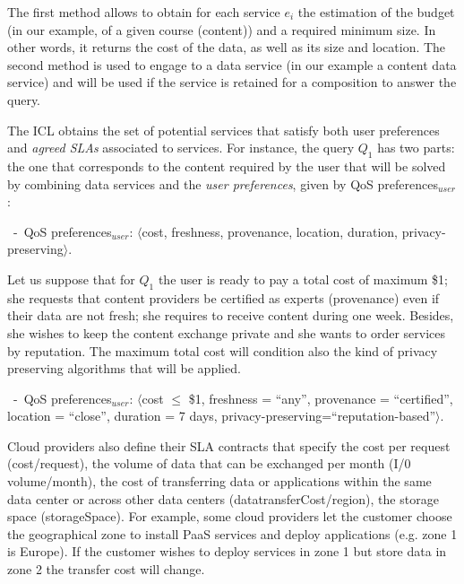  

The first method allows to obtain for each service $e_i$ the estimation of the budget (in our example, of a given course (content)) and a required minimum size. In other words, it  returns the cost of the data, as well as its  size and location.
The second method is used to engage to a data service (in our example a content data service) and will be used  if the service is retained for a composition to answer the query.

 

The ICL  obtains the set of potential services that satisfy both user preferences and   \textit{agreed SLAs} associated to services. 
For instance, the query $Q_1$ has two parts: the one that corresponds to the content required by the user  that will be solved by combining data services and the \textit{user preferences}, given by {QoS preferences}$_\mathit{user}$:
\begin{trivlist}\sf\footnotesize
\item[~-~QoS preferences$_\mathit{user}$: ] $\langle$cost, freshness, provenance, location, duration, privacy-preserving$\rangle$. 
\end{trivlist}


Let us suppose that for $Q_1$  the user is ready to pay a total cost of maximum  \$1; she requests that content providers be certified as experts (provenance) even if their data are not fresh; she requires to receive content  during  one week. Besides, she wishes to keep the content exchange private and she wants to order services by reputation. The maximum total cost will condition also the kind of privacy preserving algorithms that will be applied.
 
\begin{trivlist}\sf\footnotesize
\item[~-~QoS preferences$_\mathit{user}$: ] $\langle$cost $\leq$ \$1, freshness = ``any'', provenance = ``certified'', location = ``close'', duration = 7 days, privacy-preserving=``reputation-based''$\rangle$. 
\end{trivlist}



Cloud providers also define their SLA contracts that specify the cost per request ({cost/request}), the volume of data that can be exchanged per month ({I/0 volume/month}), the cost of transferring data or applications within the same data center or across other data centers ({datatransferCost/region}), the storage space ({storageSpace}). For example, some cloud providers let the customer  choose the geographical zone to install PaaS services and deploy applications (e.g. zone 1 is Europe). If the customer wishes to deploy services in zone 1 but store data in zone 2 the transfer cost will change.

